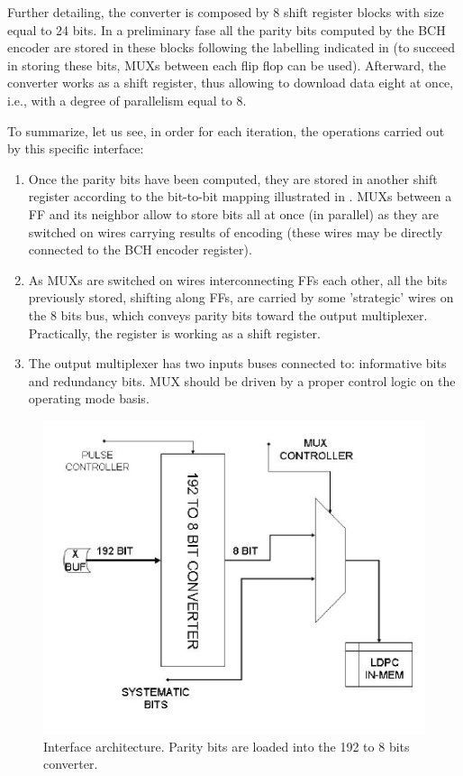 Further detailing, the converter is composed by 8 shift register blocks with size equal to 24 bits. In a preliminary fase all the parity bits computed by the BCH encoder are stored in these blocks following the labelling indicated in  (to succeed in storing these bits, MUXs between each flip flop can be used). Afterward, the converter works as a shift register, thus allowing to download data eight at once, i.e., with a degree of parallelism equal to 8.

To summarize, let us see, in order for each iteration, the operations carried out by this specific interface:

\begin{enumerate}
\item Once the parity bits have been computed, they are stored in another shift register according to the bit-to-bit mapping illustrated in . MUXs between a FF and its neighbor allow to store bits all at once (in parallel) as they are switched on wires carrying results of encoding (these wires may be directly connected to the BCH encoder register).
\item As MUXs are switched on wires interconnecting FFs each other, all the bits previously stored, shifting along FFs, are carried by some 'strategic' wires on the 8 bits bus, which conveys parity bits toward the output multiplexer.
    Practically, the register is working as a shift register.
\item The output multiplexer has two inputs buses connected to: informative bits and redundancy bits. MUX should be driven by a proper control logic on the operating mode basis.
\end{enumerate}



\begin{figure} \centering
\includegraphics[scale=0.8]{Interface}
\caption{Interface architecture. Parity bits are loaded into the 192 to 8 bits converter.} \label{fig:Interface}
\end{figure}


